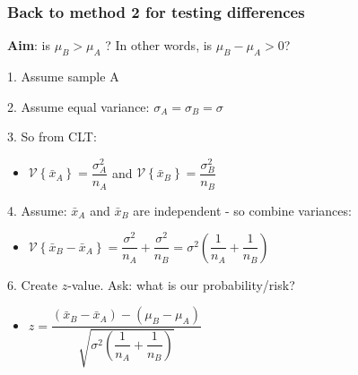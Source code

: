 \begin{frame}\frametitle{Back to method 2 for testing differences}

	\textbf{Aim}: is $\mu_B > \mu_A$ ? In other words, is $\mu_B - \mu_A > 0$?

	1. Assume sample A

	2. Assume equal variance: $\sigma_A = \sigma_B = \sigma$

	3. So from CLT:
	\begin{itemize}
		\item	$\mathcal{V}\left\{\bar{x}_A\right\} = \dfrac{\sigma^2_A}{n_A}$ and $\mathcal{V}\left\{\bar{x}_B\right\} = \dfrac{\sigma^2_B}{n_B}$
	\end{itemize}

	4. Assume: $\bar{x}_A$ and $\bar{x}_B$ are independent - so combine variances:
	\begin{itemize}
		\item	$\mathcal{V}\left\{\bar{x}_B - \bar{x}_A\right\} = \dfrac{\sigma^2}{n_A} + \dfrac{\sigma^2}{n_B} = \sigma^2 \left(\dfrac{1}{n_A} + \dfrac{1}{n_B}\right)$
	\end{itemize}

	6. Create $z$-value. Ask: what is our probability/risk?
	\begin{itemize}
		\item$z = \dfrac{(\bar{x}_B - \bar{x}_A) - (\mu_B - \mu_A)}{\sqrt{\sigma^2 \left(\dfrac{1}{n_A} + \dfrac{1}{n_B}\right)}}$
	\end{itemize}

	
\end{frame}

